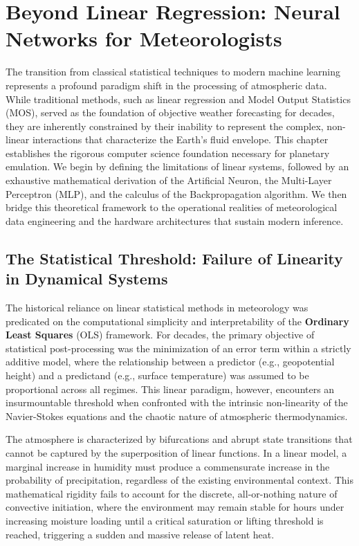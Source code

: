 \chapter{Beyond Linear Regression: Neural Networks for Meteorologists}

The transition from classical statistical techniques to modern machine learning represents a profound paradigm shift in the processing of atmospheric data. While traditional methods, such as linear regression and Model Output Statistics (MOS), served as the foundation of objective weather forecasting for decades, they are inherently constrained by their inability to represent the complex, non-linear interactions that characterize the Earth's fluid envelope. This chapter establishes the rigorous computer science foundation necessary for planetary emulation. We begin by defining the limitations of linear systems, followed by an exhaustive mathematical derivation of the Artificial Neuron, the Multi-Layer Perceptron (MLP), and the calculus of the Backpropagation algorithm. We then bridge this theoretical framework to the operational realities of meteorological data engineering and the hardware architectures that sustain modern inference.

\section{The Statistical Threshold: Failure of Linearity in Dynamical Systems}

The historical reliance on linear statistical methods in meteorology was predicated on the computational simplicity and interpretability of the \textbf{Ordinary Least Squares} (OLS) framework. For decades, the primary objective of statistical post-processing was the minimization of an error term within a strictly additive model, where the relationship between a predictor (e.g., geopotential height) and a predictand (e.g., surface temperature) was assumed to be proportional across all regimes. This linear paradigm, however, encounters an insurmountable threshold when confronted with the intrinsic non-linearity of the Navier-Stokes equations and the chaotic nature of atmospheric thermodynamics. 

The atmosphere is characterized by bifurcations and abrupt state transitions that cannot be captured by the superposition of linear functions. In a linear model, a marginal increase in humidity must produce a commensurate increase in the probability of precipitation, regardless of the existing environmental context. This mathematical rigidity fails to account for the discrete, all-or-nothing nature of convective initiation, where the environment may remain stable for hours under increasing moisture loading until a critical saturation or lifting threshold is reached, triggering a sudden and massive release of latent heat.

